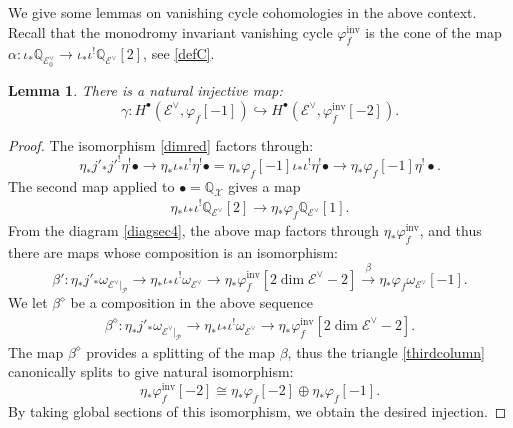 \documentclass [11pt,oneside,a4paper,mathscr]{amsart}
\newtheorem{lemma}[thm]{Lemma}
\theoremstyle{definition}
\newcommand{\X}{\mathscr{X}}
\begin{document}
We give some lemmas on 
vanishing cycle cohomologies in the above context. 
Recall that 
the monodromy invariant vanishing cycle 
$\varphi_f^{\mathrm{inv}}$ is the cone of the map $\alpha\colon \iota_{\ast}\mathbb{Q}_{\mathscr{E}^\vee_0}\to \iota_{\ast}\iota^!\mathbb{Q}_{\mathscr{E}^\vee}[2]$, see \eqref{defC}.
\begin{lemma}\label{lem:moninj}
There is a natural injective map:
\begin{equation}\label{gamma}
\gamma\colon H^\bullet(\mathscr{E}^\vee, \varphi_f[-1])\hookrightarrow H^\bullet(\mathscr{E}^\vee, \varphi_f^{\mathrm{inv}}[-2]).\end{equation}
\end{lemma}
\begin{proof}
The isomorphism \eqref{dimred} factors through:
\[\eta_*j'_*j'^!\eta^!\bullet\to \eta_*\iota_*\iota^!\eta^!\bullet
=\eta_*\varphi_f[-1]\iota_*\iota^!\eta^!\bullet
\to
\eta_*\varphi_f[-1] \eta^!\bullet.\]
The second map applied to $\bullet=\mathbb{Q}_{\X}$ gives 
a map 
\begin{align*}
    \eta_*\iota_*\iota^!\mathbb{Q}_{\mathscr{E}^\vee}[2]\to \eta_*\varphi_f\mathbb{Q}_{\mathscr{E}^\vee}[1].
\end{align*}
From the diagram \eqref{diagsec4}, the above 
map factors through $\eta_*\varphi_f^{\mathrm{inv}}$, and thus
there are maps whose composition is an isomorphism:
\begin{equation}\label{betaprime}
\beta'\colon \eta_*j'_*\omega_{\mathscr{E}^\vee|_\mathscr{P}}\to \eta_*\iota_*\iota^!\omega_{\mathscr{E}^\vee}\to \eta_*\varphi_f^{\mathrm{inv}}[2\dim \mathscr{E}^\vee-2]\xrightarrow{\beta} \eta_*\varphi_f\omega_{\mathscr{E}^\vee}[-1].
\end{equation}
We let 
$\beta^\diamond$ be a composition 
in the above sequence 
\begin{align*}\beta^\diamond\colon \eta_*j'_*\omega_{\mathscr{E}^\vee|_\mathscr{P}}\to \eta_*\iota_*\iota^!\omega_{\mathscr{E}^\vee}\to \eta_*\varphi_f^{\mathrm{inv}}[2\dim \mathscr{E}^\vee-2].
\end{align*}
The map $\beta^\diamond$ provides a splitting of the map $\beta$, thus the triangle \eqref{thirdcolumn} 
canonically splits to give natural isomorphism:
\begin{equation}\label{notdagger}
\eta_*\varphi_f^{\mathrm{inv}}[-2]\cong \eta_*\varphi_f[-2]\oplus \eta_*\varphi_f[-1].
\end{equation}
By taking global sections of this isomorphism, 
we obtain the desired injection. 
\end{proof}
\end{document}
